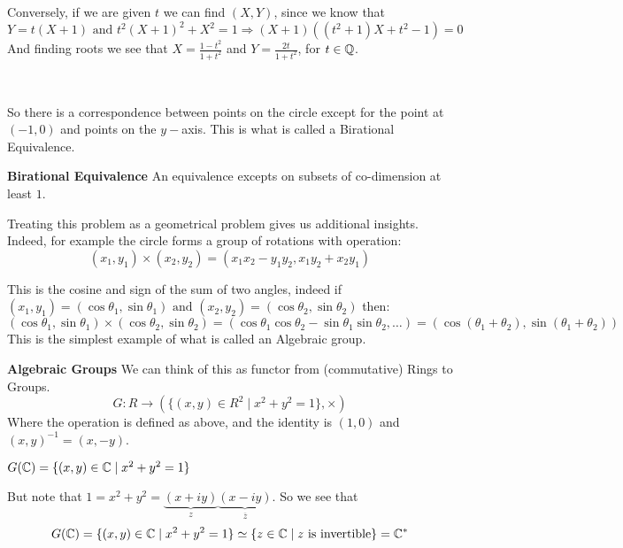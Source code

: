 \begin{enumerate}
    Conversely, if we are given $t$ we can find $(X,Y)$, since we know that\begin{equation*}
        Y=t(X+1) \text{ and }t^2(X+1)^2 + X^2 = 1 \Rightarrow (X+1)((t^2+1)X+t^2-1) = 0
    \end{equation*}
    And finding roots we see that $X = \frac{1-t^2}{1+t^2}$ and $Y=\frac{2t}{1+t^2}$, for $t\in \mathbb{Q}$.
    
    \
    
    So there is a correspondence between points on the circle except for the point at $(-1,0)$ and points on the $y-$axis. This is what is called a Birational Equivalence.
    
    \textbf{Birational Equivalence}
    An equivalence excepts on subsets of co-dimension at least $1$.
\end{enumerate}
Treating this problem as a geometrical problem gives us additional insights. Indeed, for example the circle forms a group of rotations with operation:\begin{equation}
    (x_1,y_1)\times (x_2,y_2) = (x_1x_2-y_1y_2,x_1y_2+x_2y_1)
\end{equation}

This is the cosine and sign of the sum of two angles, indeed if $(x_1,y_1) = (\cos\theta_1,\sin\theta_1)\text{ and }(x_2,y_2) = (\cos\theta_2,\sin\theta_2)$ then:\begin{equation}
 (\cos\theta_1,\sin\theta_1)\times (\cos\theta_2,\sin\theta_2) = (\cos\theta_1\cos\theta_2-\sin\theta_1\sin\theta_2, \dots) = (\cos(\theta_1+\theta_2),\sin(\theta_1+\theta_2))
\end{equation}
This is the simplest example of what is called an Algebraic group.

\textbf{Algebraic Groups} We can think of this as functor from (commutative) Rings to Groups.
\begin{equation}
   G\colon R\rightarrow (\{(x,y)\in R^2\mid x^2+y^2=1\},\times)
\end{equation}
Where the operation is defined as above, and the identity is $(1,0)$ and $(x,y)^{-1} = (x,-y)$.

\example $G(\mathbb{C}) = \{(x,y)\in\mathbb{C} \mid x^2+y^2 = 1\}$

But note that $1 = x^2+y^2 = {\underbrace{(x+iy)}_z}{\underbrace{(x-iy)}_{\overline{z}}}$. So we see that \begin{equation}
    G(\mathbb{C}) = \{(x,y)\in\mathbb{C} \mid x^2+y^2 = 1\}\simeq \{z\in \mathbb{C} \mid z\text{ is invertible}\} = \mathbb{C}^\ast
\end{equation}

